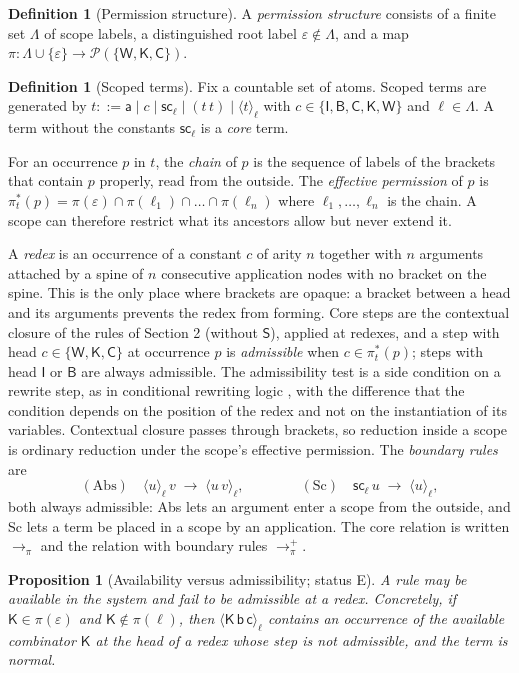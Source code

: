 \documentclass[11pt]{article}
\newtheorem{proposition}[theorem]{Proposition}
\theoremstyle{definition}
\newtheorem{definition}[theorem]{Definition}
\theoremstyle{remark}
\newcommand{\cI}{\mathsf{I}}
\newcommand{\cB}{\mathsf{B}}
\newcommand{\cC}{\mathsf{C}}
\newcommand{\cK}{\mathsf{K}}
\newcommand{\cW}{\mathsf{W}}
\newcommand{\cS}{\mathsf{S}}
\newcommand{\br}[2]{\langle #1\rangle_{#2}}
\newcommand{\sca}[1]{\mathsf{sc}_{#1}}
\newcommand{\Perm}{\mathcal{P}}
\newcommand{\Et}{status E}
\begin{document}
\begin{definition}[Permission structure]
A \emph{permission structure} consists of a finite set $\Lambda$ of scope labels, a distinguished root label $\varepsilon\notin\Lambda$, and a map $\pi:\Lambda\cup\{\varepsilon\}\to\Perm(\{\cW,\cK,\cC\})$.
\end{definition}

\begin{definition}[Scoped terms]
Fix a countable set of atoms. Scoped terms are generated by $t::=\mathsf a\mid c\mid\sca\ell\mid(t\,t)\mid\br t\ell$ with $c\in\{\cI,\cB,\cC,\cK,\cW\}$ and $\ell\in\Lambda$. A term without the constants $\sca\ell$ is a \emph{core} term.
\end{definition}

For an occurrence $p$ in $t$, the \emph{chain} of $p$ is the sequence of labels of the brackets that contain $p$ properly, read from the outside. The \emph{effective permission} of $p$ is $\pi^\ast_t(p)=\pi(\varepsilon)\cap\pi(\ell_1)\cap\dots\cap\pi(\ell_n)$ where $\ell_1,\dots,\ell_n$ is the chain. A scope can therefore restrict what its ancestors allow but never extend it.

A \emph{redex} is an occurrence of a constant $c$ of arity $n$ together with $n$ arguments attached by a spine of $n$ consecutive application nodes with no bracket on the spine. This is the only place where brackets are opaque: a bracket between a head and its arguments prevents the redex from forming. Core steps are the contextual closure of the rules of Section 2 (without $\cS$), applied at redexes, and a step with head $c\in\{\cW,\cK,\cC\}$ at occurrence $p$ is \emph{admissible} when $c\in\pi^\ast_t(p)$; steps with head $\cI$ or $\cB$ are always admissible. The admissibility test is a side condition on a rewrite step, as in conditional rewriting logic \citep{meseguer1992}, with the difference that the condition depends on the position of the redex and not on the instantiation of its variables. Contextual closure passes through brackets, so reduction inside a scope is ordinary reduction under the scope's effective permission. The \emph{boundary rules} are
\[
(\mathrm{Abs})\quad\br u\ell\,v\;\to\;\br{u\,v}\ell,\qquad\qquad
(\mathrm{Sc})\quad\sca\ell\,u\;\to\;\br u\ell,
\]
both always admissible: Abs lets an argument enter a scope from the outside, and Sc lets a term be placed in a scope by an application. The core relation is written $\to_\pi$ and the relation with boundary rules $\to_\pi^{+}$.

\begin{proposition}[Availability versus admissibility; \Et]\label{prop:avail}
A rule may be available in the system and fail to be admissible at a redex. Concretely, if $\cK\in\pi(\varepsilon)$ and $\cK\notin\pi(\ell)$, then $\br{\cK\,\mathsf b\,\mathsf c}\ell$ contains an occurrence of the available combinator $\cK$ at the head of a redex whose step is not admissible, and the term is normal.
\end{proposition}
\end{document}
